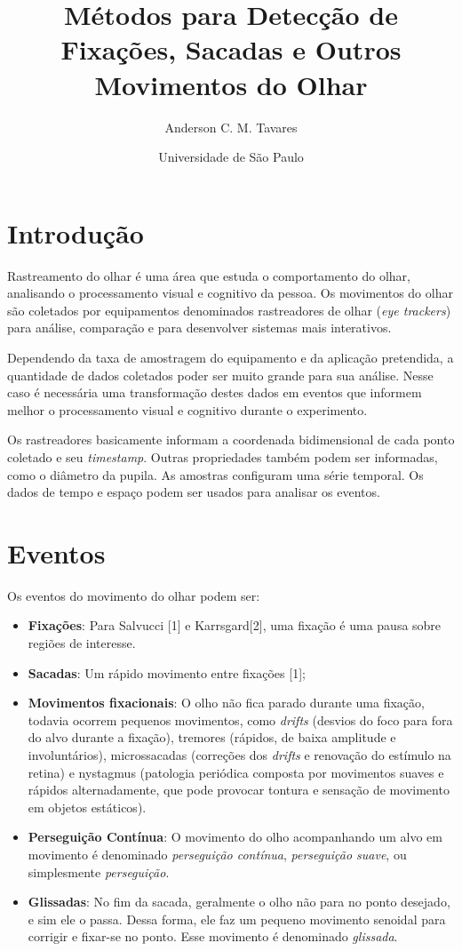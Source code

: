 \documentclass[brazil,]{report}
\title{Métodos para Detecção de Fixações, Sacadas e Outros Movimentos do Olhar}
\author{Anderson C. M. Tavares}
\date{Universidade de São Paulo}
\begin{document}
\maketitle

\chapter{Introdução}\label{introduuxe7uxe3o}

Rastreamento do olhar é uma área que estuda o comportamento do olhar,
analisando o processamento visual e cognitivo da pessoa. Os movimentos
do olhar são coletados por equipamentos denominados rastreadores de
olhar (\emph{eye trackers}) para análise, comparação e para desenvolver
sistemas mais interativos.

Dependendo da taxa de amostragem do equipamento e da aplicação
pretendida, a quantidade de dados coletados poder ser muito grande para
sua análise. Nesse caso é necessária uma transformação destes dados em
eventos que informem melhor o processamento visual e cognitivo durante o
experimento.

Os rastreadores basicamente informam a coordenada bidimensional de cada
ponto coletado e seu \emph{timestamp}. Outras propriedades também podem
ser informadas, como o diâmetro da pupila. As amostras configuram uma
série temporal. Os dados de tempo e espaço podem ser usados para
analisar os eventos.

\chapter{Eventos}\label{eventos}

Os eventos do movimento do olhar podem ser:

\begin{itemize}
\itemsep1pt\parskip0pt
\item
  \textbf{Fixações}: Para Salvucci {[}1{]} e Karrsgard{[}2{]}, uma
  fixação é uma pausa sobre regiões de interesse.
\item
  \textbf{Sacadas}: Um rápido movimento entre fixações {[}1{]};
\item
  \textbf{Movimentos fixacionais}: O olho não fica parado durante uma
  fixação, todavia ocorrem pequenos movimentos, como \emph{drifts}
  (desvios do foco para fora do alvo durante a fixação), tremores
  (rápidos, de baixa amplitude e involuntários), microssacadas
  (correções dos \emph{drifts} e renovação do estímulo na retina) e
  nystagmus (patologia periódica composta por movimentos suaves e
  rápidos alternadamente, que pode provocar tontura e sensação de
  movimento em objetos estáticos).
\item
  \textbf{Perseguição Contínua}: O movimento do olho acompanhando um
  alvo em movimento é denominado \emph{perseguição contínua},
  \emph{perseguição suave}, ou simplesmente \emph{perseguição}.
\item
  \textbf{Glissadas}: No fim da sacada, geralmente o olho não para no
  ponto desejado, e sim ele o passa. Dessa forma, ele faz um pequeno
  movimento senoidal para corrigir e fixar-se no ponto. Esse movimento é
  denominado \emph{glissada}.
\end{itemize}
\end{document}
